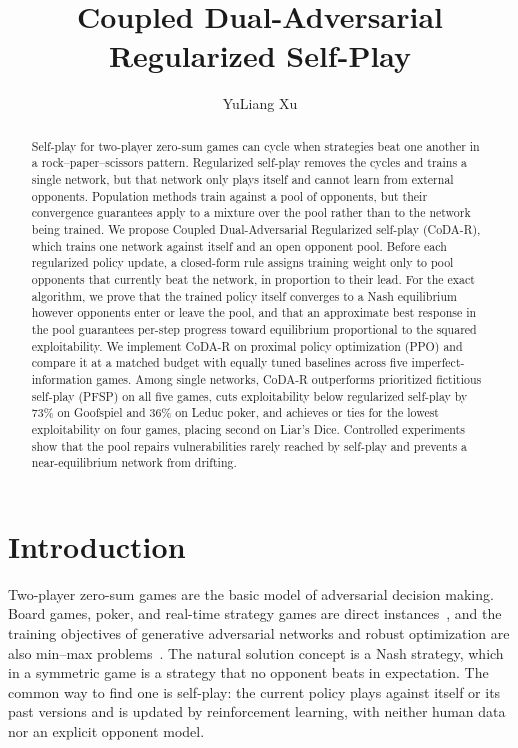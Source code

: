 \documentclass{article}
\title{Coupled Dual-Adversarial Regularized Self-Play}
\author{YuLiang Xu}
\affiliation{Beijing No.~8 High School}
\theoremstyle{plain}
\theoremstyle{remark}
\begin{document}
\maketitle

\begin{abstract}
Self-play for two-player zero-sum games can cycle when strategies beat one another in a rock--paper--scissors pattern. Regularized self-play removes the cycles and trains a single network, but that network only plays itself and cannot learn from external opponents. Population methods train against a pool of opponents, but their convergence guarantees apply to a mixture over the pool rather than to the network being trained. We propose Coupled Dual-Adversarial Regularized self-play (CoDA-R), which trains one network against itself and an open opponent pool. Before each regularized policy update, a closed-form rule assigns training weight only to pool opponents that currently beat the network, in proportion to their lead. For the exact algorithm, we prove that the trained policy itself converges to a Nash equilibrium however opponents enter or leave the pool, and that an approximate best response in the pool guarantees per-step progress toward equilibrium proportional to the squared exploitability. We implement CoDA-R on proximal policy optimization (PPO) and compare it at a matched budget with equally tuned baselines across five imperfect-information games. Among single networks, CoDA-R outperforms prioritized fictitious self-play (PFSP) on all five games, cuts exploitability below regularized self-play by 73\% on Goofspiel and 36\% on Leduc poker, and achieves or ties for the lowest exploitability on four games, placing second on Liar's Dice. Controlled experiments show that the pool repairs vulnerabilities rarely reached by self-play and prevents a near-equilibrium network from drifting.
\end{abstract}

\section{Introduction}

Two-player zero-sum games are the basic model of adversarial decision making. Board games, poker, and real-time strategy games are direct instances~\citep{silver2018alphazero,brown2018libratus,vinyals2019alphastar,perolat2022stratego}, and the training objectives of generative adversarial networks and robust optimization are also min--max problems~\citep{goodfellow2014gan,daskalakis2018optimism}. The natural solution concept is a Nash strategy, which in a symmetric game is a strategy that no opponent beats in expectation. The common way to find one is self-play: the current policy plays against itself or its past versions and is updated by reinforcement learning, with neither human data nor an explicit opponent model.
\end{document}
